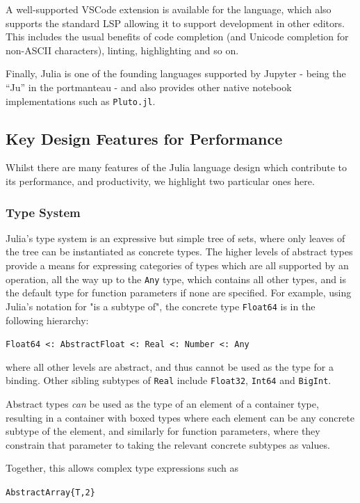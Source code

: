 \documentclass{webofc}
\begin{document}
A well-supported VSCode extension is available for the language, which also
supports the standard LSP allowing it to support development in other editors.
This includes the usual benefits of code completion (and Unicode completion for
non-ASCII characters), linting, highlighting and so on.

Finally, Julia is one of the founding languages supported by Jupyter - being the
``Ju'' in the portmanteau - and also provides other native notebook
implementations such as \texttt{Pluto.jl}. 

\subsection{Key Design Features for Performance}

Whilst there are many features of the Julia language design which contribute to its 
performance, and productivity, we highlight two particular ones here.

\subsubsection{Type System}

Julia's type system is an expressive but simple tree of sets, where only leaves 
of the tree can be instantiated as concrete types. The higher levels of abstract
 types provide a means for expressing categories of types which are all supported
 by an operation, all the way up to the \verb$Any$ type, which contains all other
 types, and is the default type for function parameters if none are specified. 
For example, using Julia's notation for "is a subtype of", the concrete type \verb$Float64$
 is in the following hierarchy:

\verb$Float64 <: AbstractFloat <: Real <: Number <: Any$

where all other levels are abstract, and thus cannot be used as the type for a binding.
Other sibling subtypes of \verb$Real$ include \verb$Float32$, \verb$Int64$ and \verb$BigInt$.

Abstract types \textit{can} be used as the type of an element of a container type, resulting in a container with boxed types where each element can be any concrete
 subtype of the element, and similarly for function parameters, where they constrain
 that parameter to taking the relevant concrete subtypes as values. 

Together, this allows complex type expressions such as

\verb$AbstractArray{T,2}$ 
\end{document}
